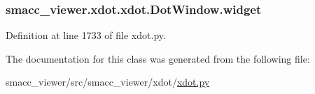 \subsubsection[{\texorpdfstring{widget}{widget}}]{\setlength{\rightskip}{0pt plus 5cm}smacc\+\_\+viewer.\+xdot.\+xdot.\+Dot\+Window.\+widget}\hypertarget{classsmacc__viewer_1_1xdot_1_1xdot_1_1DotWindow_acf94d47f2f1d324385997e26e6a46225}{}\label{classsmacc__viewer_1_1xdot_1_1xdot_1_1DotWindow_acf94d47f2f1d324385997e26e6a46225}


Definition at line 1733 of file xdot.\+py.



The documentation for this class was generated from the following file\+:\begin{DoxyCompactItemize}
\item 
smacc\+\_\+viewer/src/smacc\+\_\+viewer/xdot/\hyperlink{xdot_8py}{xdot.\+py}\end{DoxyCompactItemize}
